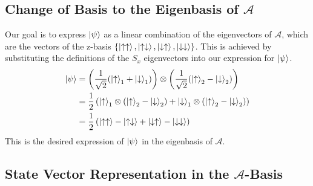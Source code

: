 \documentclass[11pt,a4paper]{article}
\begin{document}
\subsection{Change of Basis to the Eigenbasis of $\mathcal{A}$}

Our goal is to express $\ket{\psi}$ as a linear combination of the eigenvectors of $\mathcal{A}$, which are the vectors of the z-basis $\{\ket{\uparrow\uparrow}, \ket{\uparrow\downarrow}, \ket{\downarrow\uparrow}, \ket{\downarrow\downarrow}\}$. This is achieved by substituting the definitions of the $S_x$ eigenvectors into our expression for $\ket{\psi}$.
\begin{align}
    \ket{\psi} &= \left( \frac{1}{\sqrt{2}} (\ket{\uparrow}_1 + \ket{\downarrow}_1) \right) \otimes \left( \frac{1}{\sqrt{2}} (\ket{\uparrow}_2 - \ket{\downarrow}_2) \right) \nonumber \\
    &= \frac{1}{2} \left( \ket{\uparrow}_1 \otimes (\ket{\uparrow}_2 - \ket{\downarrow}_2) + \ket{\downarrow}_1 \otimes (\ket{\uparrow}_2 - \ket{\downarrow}_2) \right) \nonumber \\
    &= \frac{1}{2} \left( \ket{\uparrow\uparrow} - \ket{\uparrow\downarrow} + \ket{\downarrow\uparrow} - \ket{\downarrow\downarrow} \right)
\end{align}
This is the desired expression of $\ket{\psi}$ in the eigenbasis of $\mathcal{A}$.

\subsection{State Vector Representation in the $\mathcal{A}$-Basis}
\end{document}
